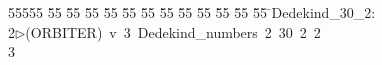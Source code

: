 %
%
\begin{tabbing}
55555 \= 55 \= 55 \= 55 \= 55 \= 55 \= 55 \= 55 \= 55 \= 55 \= 55 \= 55 \= 55 \= \>Dedekind\_30\_2:\\[0pt]
2\>$\triangleright$\>(ORBITER)\ v\ 3\ Dedekind\_numbers\ 2\ 30\ 2\ 2\\[0pt]
3\>\end{tabbing}
